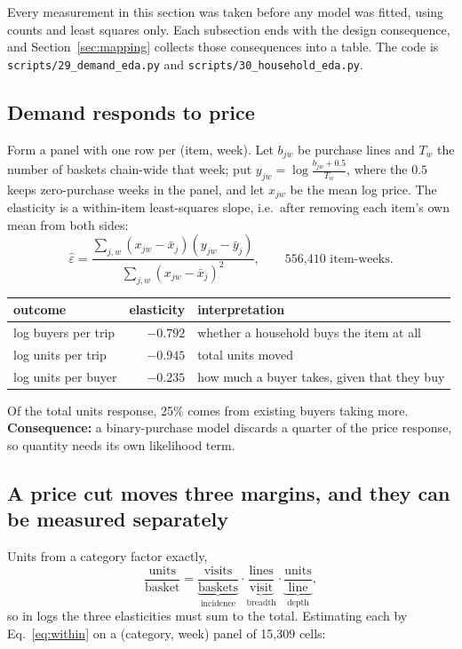 \documentclass[11pt]{article}
\newcommand{\code}[1]{\texttt{#1}}
\begin{document}
Every measurement in this section was taken before any model was fitted, using counts
and least squares only. Each subsection ends with the design consequence, and
Section~\ref{sec:mapping} collects those consequences into a table. The code is
\code{scripts/29\_demand\_eda.py} and \code{scripts/30\_household\_eda.py}.

\subsection{Demand responds to price}
\label{sec:elast}

Form a panel with one row per (item, week). Let $b_{jw}$ be purchase lines and $T_w$ the
number of baskets chain-wide that week; put $y_{jw}=\log\frac{b_{jw}+0.5}{T_w}$, where
the $0.5$ keeps zero-purchase weeks in the panel, and let $x_{jw}$ be the mean log price.
The elasticity is a within-item least-squares slope, i.e.\ after removing each item's own
mean from both sides:
\begin{equation}
\hat\varepsilon=
\frac{\sum_{j,w}(x_{jw}-\bar x_j)(y_{jw}-\bar y_j)}{\sum_{j,w}(x_{jw}-\bar x_j)^2},
\qquad\text{556,410 item-weeks.}
\label{eq:within}
\end{equation}

\begin{center}
\begin{tabular}{lrl}
\toprule
outcome & elasticity & interpretation \\
\midrule
log buyers per trip & $-0.792$ & whether a household buys the item at all \\
log units per trip  & $-0.945$ & total units moved \\
log units per buyer & $-0.235$ & how much a buyer takes, given that they buy \\
\bottomrule
\end{tabular}
\end{center}

Of the total units response, 25\% comes from existing buyers taking more.
\textbf{Consequence:} a binary-purchase model discards a quarter of the price response,
so quantity needs its own likelihood term.

\subsection{A price cut moves three margins, and they can be measured separately}

Units from a category factor exactly,
\begin{equation}
\frac{\text{units}}{\text{basket}}
=\underbrace{\frac{\text{visits}}{\text{baskets}}}_{\text{incidence}}
\cdot\underbrace{\frac{\text{lines}}{\text{visit}}}_{\text{breadth}}
\cdot\underbrace{\frac{\text{units}}{\text{line}}}_{\text{depth}},
\end{equation}
so in logs the three elasticities must sum to the total. Estimating each by
Eq.~\ref{eq:within} on a (category, week) panel of 15,309 cells:
\end{document}

